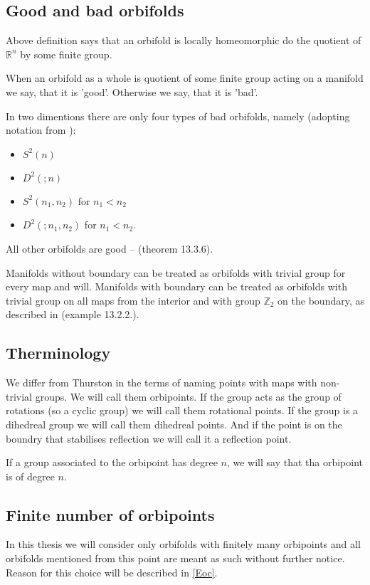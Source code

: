 \subsection{Good and bad orbifolds}
Above definition says that an orbifold is locally homeomorphic do the quotient of $\mathbb{R}^n$ 
by some finite group. 

When an orbifold as a whole is quotient of some finite group acting on a manifold we say, that 
it is 'good'. Otherwise we say, that it is 'bad'. 


In two dimentions there are only four types of bad orbifolds, namely
(adopting notation from \cite{Thurston1979}): 
\begin{itemize}
\item $S^2(n)$ 
\item $D^2(;n)$ 
\item $S^2(n_1,n_2)$ for $n_1 < n_2$ 
\item $D^2(;n_1,n_2)$ for $n_1 < n_2$. 
\end{itemize}
All other orbifolds are good -- \cite{Thurston1979} (theorem 13.3.6).


Manifolds without boundary can be treated as orbifolds with trivial group for every map and will. 
Manifolds with boundary can be treated as orbifolds with trivial group on all maps from the 
interior and with group $\mathbb{Z}_2$ on the boundary, as described in \cite{Thurston1979} 
(example 13.2.2.).

\subsection{Therminology}
We differ from Thurston in the terms of naming points with maps with non-trivial groups. 
We will call them orbipoints. If the group acts as the group of rotations (so a 
cyclic group) we will call them rotational points. If the group is a dihedreal group we will 
call them 
dihedreal points. And if the point is on the boundry that stabilises reflection we will call it a 
reflection point. 

If a group associated to the orbipoint has degree $n$, we will say that tha orbipoint is 
of degree $n$. 
\subsection{Finite number of orbipoints}\label{finite number of orbipoints}
In this thesis we will consider only orbifolds with finitely many orbipoints and all orbifolds 
mentioned from this point are meant as such without further notice. Reason for this 
choice will be described in \ref{Eoc}.  


